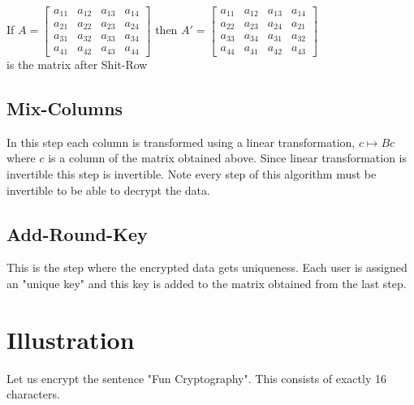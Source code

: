 \vspace{3mm}
If \(A=\begin{bmatrix}
    a_{11}&a_{12}&a_{13}&a_{14}\\
    a_{21}&a_{22}&a_{23}&a_{24}\\
    a_{31}&a_{32}&a_{33}&a_{34}\\
    a_{41}&a_{42}&a_{43}&a_{44}
    \end{bmatrix}\) \hspace{3mm} then \(A'=\begin{bmatrix}
    a_{11}&a_{12}&a_{13}&a_{14}\\
    a_{22}&a_{23}&a_{24}&a_{21}\\
    a_{33}&a_{34}&a_{31}&a_{32}\\
    a_{44}&a_{41}&a_{42}&a_{43}
    \end{bmatrix}\) \vspace{2mm} \\[3mm] is the matrix after Shit-Row

\subsection{Mix-Columns}
In this step each column is transformed using a linear transformation, \(c \mapsto Bc\) where \(c\) is a column of the matrix obtained above. Since linear transformation is invertible this step is invertible. Note every step of this algorithm must be invertible to be able to decrypt the data.

\subsection{Add-Round-Key}
This is the step where the encrypted data gets uniqueness. Each user is assigned an "unique key" and this key is added to the matrix obtained from the last step.

\section{Illustration}
Let us encrypt the sentence "Fun Cryptography". This consists of exactly 16 characters.\vspace{2mm}

